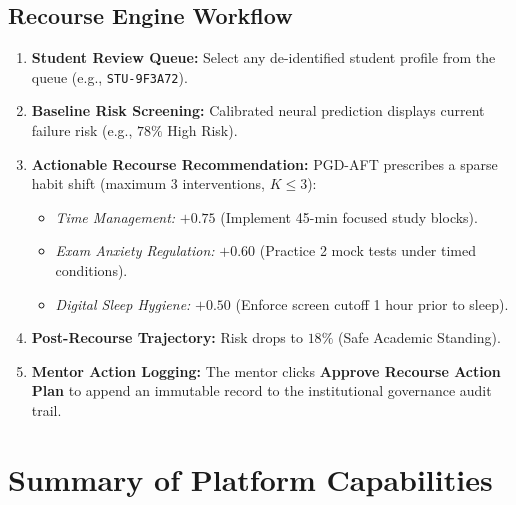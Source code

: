 \documentclass[11pt,a4paper]{article}
\begin{document}
\subsection{Recourse Engine Workflow}
\begin{enumerate}[leftmargin=*]
    \item \textbf{Student Review Queue:} Select any de-identified student profile from the queue (e.g., \texttt{STU-9F3A72}).
    \item \textbf{Baseline Risk Screening:} Calibrated neural prediction displays current failure risk (e.g., $78\%$ High Risk).
    \item \textbf{Actionable Recourse Recommendation:} PGD-AFT prescribes a sparse habit shift (maximum 3 interventions, $K \le 3$):
    \begin{itemize}
        \item \textit{Time Management:} $+0.75$ (Implement 45-min focused study blocks).
        \item \textit{Exam Anxiety Regulation:} $+0.60$ (Practice 2 mock tests under timed conditions).
        \item \textit{Digital Sleep Hygiene:} $+0.50$ (Enforce screen cutoff 1 hour prior to sleep).
    \end{itemize}
    \item \textbf{Post-Recourse Trajectory:} Risk drops to $18\%$ (Safe Academic Standing).
    \item \textbf{Mentor Action Logging:} The mentor clicks \textbf{Approve Recourse Action Plan} to append an immutable record to the institutional governance audit trail.
\end{enumerate}

\FloatBarrier
\newpage

\section{Summary of Platform Capabilities}
\end{document}
